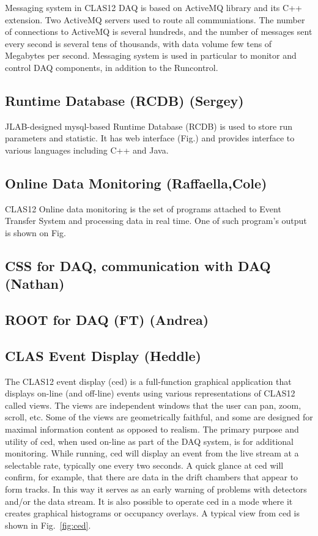 Messaging system in CLAS12 DAQ is based on ActiveMQ library and its C++ extension. Two ActiveMQ servers used to route all communiations. The number of connections to ActiveMQ is several hundreds, and the number of messages sent every second is several tens of thousands, with data volume few tens of Megabytes per second. Messaging system is used in particular to monitor and control DAQ components, in addition to the Runcontrol.


\subsection{Runtime Database (RCDB) (Sergey)}

JLAB-designed mysql-based Runtime Database (RCDB) is used to store run parameters and statistic. It has web interface (Fig.) and provides interface to various languages including C++ and Java.


\subsection{Online Data Monitoring (Raffaella,Cole)}

CLAS12 Online data monitoring is the set of programs attached to Event Transfer System and processing data in real time. One of such program's output is shown on Fig.



\subsection{CSS for DAQ, communication with DAQ (Nathan)}



\subsection{ROOT for DAQ (FT) (Andrea)}



\subsection{CLAS Event Display (Heddle)}

The CLAS12 event display (ced) is a full-function graphical application that displays on-line (and off-line) events using various representations of CLAS12 called views. The views are independent windows that the user can pan, zoom, scroll, etc. Some of the views are geometrically faithful, and some are designed for maximal information content as opposed to realism. The primary purpose and utility of ced, when used on-line as part of the DAQ system, is for additional monitoring. While running, ced will display an event from the live stream at a selectable rate, typically one every two seconds. A quick glance at ced will confirm, for example, that there are data in the drift chambers that appear to form tracks. In this way it serves as an early warning of problems with detectors and/or the data stream. It is also possible to operate ced in a mode where it creates graphical histograms or occupancy overlays. A typical view from ced is shown in Fig.~\ref{fig:ced}.

